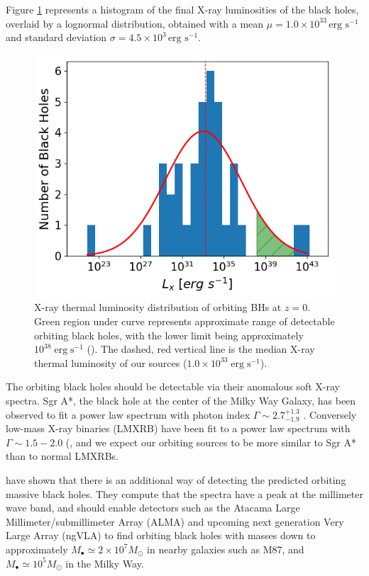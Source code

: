 \documentclass[fleqn,usenatbib,useAMS]{mnras}
\begin{document}
Figure \ref{fig:ldobhs} represents a histogram of the final X-ray luminosities of the black holes, overlaid by a lognormal distribution, obtained with a mean $\mu=1.0\times10^{33}\,\text{erg s}^{-1}$ and standard deviation $\sigma=4.5\times10^{3}\,\text{erg s}^{-1}$.
\begin{figure}
\begin{center}
\includegraphics[width=1.0\columnwidth]{plots/Final_Luminosities_using_Kohei_factor.png}
\caption{X-ray thermal luminosity distribution of orbiting BHs at $z=0$.  Green region under curve represents approximate range of detectable orbiting black holes, with the lower limit being approximately $10^{38}\;\text{erg}\;\text{s}^{-1}$ (\citet{2018ApJ...862...73L}). The dashed, red vertical line is the median X-ray thermal luminosity of our sources ($1.0\times10^{33}\;\text{erg}\;\text{s}^{-1}$).}
\label{fig:ldobhs}
\end{center}
\end{figure}

The orbiting black holes should be detectable via their anomalous soft X-ray spectra. Sgr A*, the black hole at the center of the Milky Way Galaxy, has been observed to fit a power law spectrum with photon index $\Gamma\sim2.7^{+1.3}_{-1.9}$ \citet{2003ApJ...591..891B}.  Conversely low-mass X-ray binaries (LMXRB) have been fit to a power law spectrum with $\Gamma\sim1.5-2.0$ (\citet{2018Natur.556...70H}, and we expect our orbiting sources to be more similar to Sgr A* than to normal LMXRBs.

\citet{guo2020hunting} have shown that there is an additional way of detecting the predicted orbiting massive black holes. They compute that the spectra have a peak at the millimeter wave band, and should enable detectors such as the Atacama Large Millimeter/submillimeter Array (ALMA) and upcoming next generation Very Large Array (ngVLA) to find orbiting black holes with masses down to approximately $M_{\bullet}\simeq2\times10^7 M_{\odot}$ in nearby galaxies such as M87, and $M_{\bullet}\simeq10^5 M_{\odot}$ in the Milky Way.
\end{document}
